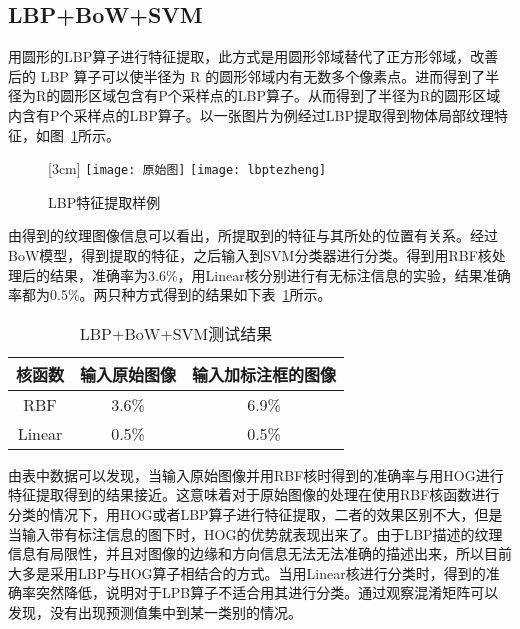 \subsection{LBP+BoW+SVM}
\label{subsec:lbpbowsvm}
用圆形的LBP算子进行特征提取，此方式是用圆形邻域替代了正方形邻域，改善后的 LBP 算子可以使半径为 R 的圆形邻域内有无数多个像素点。进而得到了半径为R的圆形区域包含有P个采样点的LBP算子。从而得到了半径为R的圆形区域内含有P个采样点的LBP算子。以一张图片为例经过LBP提取得到物体局部纹理特征，如图~\ref{fig:lbptiqu}所示。
\begin{figure}[H]
  \centering%
  [3cm] %
    {\texttt{[image: 原始图]}}%
  \qquad \qquad \qquad \qquad \qquad
      {\texttt{[image: lbptezheng]}}
  \caption{LBP特征提取样例}
  \label{fig:lbptiqu}
\end{figure}
由得到的纹理图像信息可以看出，所提取到的特征与其所处的位置有关系。经过BoW模型，得到提取的特征，之后输入到SVM分类器进行分类。得到用RBF核处理后的结果，准确率为3.6\%，用Linear核分别进行有无标注信息的实验，结果准确率都为0.5\%。两只种方式得到的结果如下表~\ref{tab:lbpbowsvm}所示。

\begin{table}[htb]
 \centering
  \begin{minipage}[t]{0.6\linewidth} %
  \caption{LBP+BoW+SVM测试结果}
  \label{tab:lbpbowsvm}
   \begin{tabularx}{\linewidth}{c|c|c}
     \toprule[1.5pt]
      核函数 &  输入原始图像  &  输入加标注框的图像\\
     \hline
      RBF & 3.6\% & 6.9\%  \\\hline
      Linear & 0.5\% & 0.5\%  \\
      \bottomrule[1.5pt]
    \end{tabularx}
  \end{minipage}
\end{table}

由表中数据可以发现，当输入原始图像并用RBF核时得到的准确率与用HOG进行特征提取得到的结果接近。这意味着对于原始图像的处理在使用RBF核函数进行分类的情况下，用HOG或者LBP算子进行特征提取，二者的效果区别不大，但是当输入带有标注信息的图下时，HOG的优势就表现出来了。由于LBP描述的纹理信息有局限性，并且对图像的边缘和方向信息无法无法准确的描述出来，所以目前大多是采用LBP与HOG算子相结合的方式。当用Linear核进行分类时，得到的准确率突然降低，说明对于LPB算子不适合用其进行分类。通过观察混淆矩阵可以发现，没有出现预测值集中到某一类别的情况。

